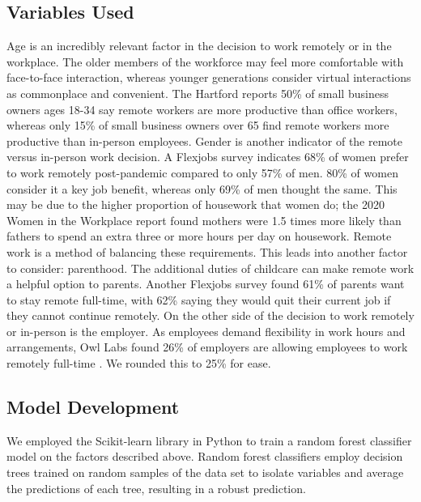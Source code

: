 \documentclass{article}
\begin{document}
\subsection{Variables Used} 
\indent
Age is an incredibly relevant factor in the decision to work remotely or in the workplace. The older members of the workforce may feel more comfortable with face-to-face interaction, whereas younger generations consider virtual interactions as commonplace and convenient. The Hartford reports 50\% of small business owners ages 18-34 say remote workers are more productive than office workers, whereas only 15\% of small business owners over 65 find remote workers more productive than in-person employees\cite{spors_2020}.
\indent
Gender is another indicator of the remote versus in-person work decision. A Flexjobs survey indicates 68\% of women prefer to work remotely post-pandemic compared to only 57\% of men. 80\% of women consider it a key job benefit, whereas only 69\% of men thought the same\cite{pelta_2022}. This may be due to the higher proportion of housework that women do; the 2020 Women in the Workplace report found mothers were 1.5 times more likely than fathers to spend an extra three or more hours per day on housework\cite{lean_in}. Remote work is a method of balancing these requirements. 
\indent
This leads into another factor to consider: parenthood. The additional duties of childcare can make remote work a helpful option to parents. Another Flexjobs survey found 61\% of parents want to stay remote full-time, with 62\% saying they would quit their current job if they cannot continue remotely\cite{flexjobs_2022}.
\indent
On the other side of the decision to work remotely or in-person is the employer. As employees demand flexibility in work hours and arrangements, Owl Labs found 26\% of employers are allowing employees to work remotely full-time \cite{owllabs}. We rounded this to 25\% for ease.
\
\subsection{Model Development}
\indent
We employed the Scikit-learn library in Python to train a random forest classifier model on the factors described above. Random forest classifiers employ decision trees trained on random samples of the data set to isolate variables and average the predictions of each tree, resulting in a robust prediction. 
\end{document}

